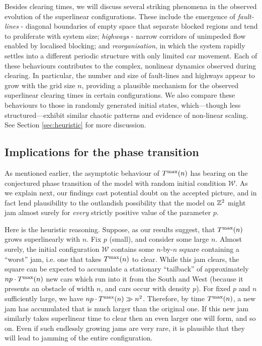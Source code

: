 \documentclass[reqno]{amsart}
\begin{document}
Besides clearing times, we will discuss several striking phenomena in the observed evolution of the superlinear configurations. These include the emergence of \textit{fault-lines} - diagonal boundaries of empty space that separate blocked regions and tend to proliferate with system size; \textit{highways} - narrow corridors of unimpeded flow enabled by localised blocking; and \textit{reorganisation}, in which the system rapidly settles into a different periodic structure with only limited car movement. Each of these behaviours contributes to the complex, nonlinear dynamics observed during clearing. In particular, the number and size of fault-lines and highways appear to grow with the grid size $n$, providing a plausible mechanism for the observed superlinear clearing times in certain configurations. We also compare these behaviours to those in randomly generated initial states, which—though less structured—exhibit similar chaotic patterns and evidence of non-linear scaling. See Section \ref{sec:heuristic} for more discussion.








\subsection*{Implications for the phase transition}

As mentioned earlier, the asymptotic behaviour of $T^{\text{\rm max}}(n)$ has bearing on the conjectured phase transition of the model with random initial condition $\mathcal{W}$.  As we explain next, our findings cast potential doubt on the accepted picture, and in fact lend plausibility to the outlandish possibility that the model on $\mathbb{Z}^2$ might jam almost surely for \emph{every} strictly positive value of the parameter $p$.

Here is the heuristic reasoning. Suppose, as our results suggest, that $T^{\text{\rm max}}(n)$ grows superlinearly with $n$.  Fix $p$ (small), and consider some large $n$.  Almost surely, the initial configuration $\mathcal{W}$ contains some $n$-by-$n$ square containing a ``worst'' jam, i.e. one that takes $T^{\text{\rm max}}(n)$ to clear.  While this jam clears, the square can be expected to accumulate a stationary ``tailback'' of approximately $n p \cdot T^{\text{\rm max}}(n)$ new cars which run into it from the South and West (because it presents an obstacle of width $n$, and cars occur with density $p$).  For fixed $p$ and $n$ sufficiently large, we have $n p \cdot T^{\text{\rm max}}(n) \gg n^2$.  Therefore, by time $T^{\text{\rm max}}(n)$, a new jam has accumulated that is much larger than the original one.  If this new jam similarly takes superlinear time to clear then an even larger one will form, and so on.  Even if such endlessly growing jams are very rare, it is plausible that they will lead to jamming of the entire configuration.
\end{document}
